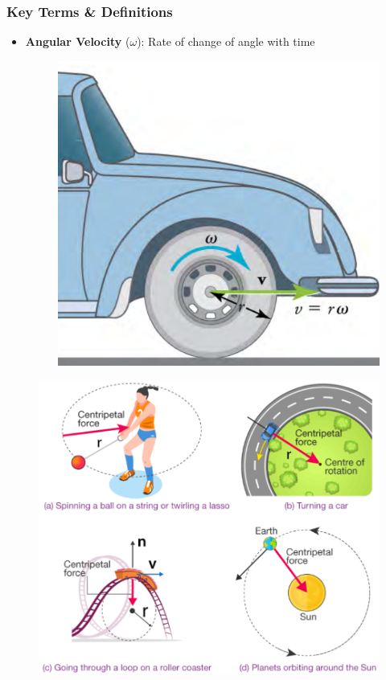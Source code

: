 \documentclass{beamer}
\begin{document}
\begin{frame}
\frametitle{Key Terms \& Definitions}
\begin{itemize}
   
    \item \textbf{Angular Velocity} ($\omega$): Rate of change of angle with time
\begin{figure}[H]
    \centering
    \includegraphics[width=0.6\linewidth]{CH6/Screenshot 2024-11-21 125846.png}
\end{figure}
\end{itemize}
\end{frame}

\begin{frame}
\begin{figure}
    \centering
    \includegraphics[width=0.8\linewidth]{CH6/Screenshot 2024-11-21 132156.png}
\end{figure}
\end{frame}
\end{document}
